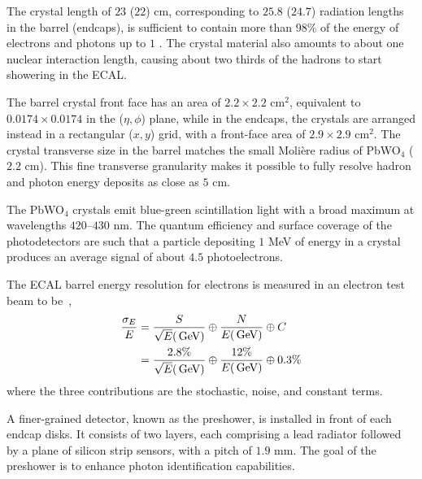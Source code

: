 The crystal length of $23$ ($22$) \unit{cm}, corresponding to $25.8$
($24.7$) radiation lengths in the barrel (endcaps), is sufficient to
contain more than 98\% of the energy of electrons and photons up to
$1$ \TeV. The crystal material also amounts to about one nuclear interaction
length, causing about two thirds of the hadrons to start showering in
the ECAL.

The barrel crystal front face has an area of  $2.2 \times 2.2$ cm$^2$, equivalent to $0.0174 \times 0.0174$ in the ($\eta,\phi$)
plane, while in the endcaps, the crystals are arranged instead in a
rectangular ($x, y$) grid, with a front-face area of $2.9 \times 2.9$
cm$^{2}$. The crystal transverse size in the barrel matches the small Moli\`{e}re radius of
PbWO$_4$ ($2.2$ cm). This fine transverse granularity makes it possible to fully resolve hadron and photon
energy deposits as close as $5$ \unit{cm}. 

The PbWO$_4$ crystals emit blue-green scintillation light with a broad
maximum at wavelengths $420–430$ \unit{nm}. The quantum efficiency and surface
coverage of the photodetectors are such that a particle depositing $1$
\unit{MeV} of energy in a crystal produces an average signal of about
$4.5$ photoelectrons.

The ECAL barrel energy resolution for electrons is measured in
an electron test beam to be~\cite{Adzic:2007mi,Chatrchyan:2013dga},
\begin{align}
\frac{\sigma_E}{E} &= \frac{S}{\sqrt E (\,\text{Ge\hspace{-.08em}V})} \oplus \frac{N}{E (\,\text{Ge\hspace{-.08em}V})} \oplus C \\
&= \frac{2.8\%}{\sqrt E (\,\text{Ge\hspace{-.08em}V})} \oplus \frac{12\%}{E (\,\text{Ge\hspace{-.08em}V})} \oplus 0.3\%
\end{align}
where the three contributions are the stochastic, noise, and constant
terms.

A finer-grained detector, known as the preshower, is installed in
front of each endcap disks. It consists of two layers, each comprising
a lead radiator followed by a plane of silicon strip sensors, with a
pitch of $1.9$ \unit{mm}. The goal of the preshower is to enhance photon
identification capabilities.

